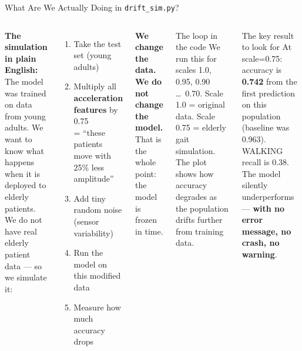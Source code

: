 \documentclass[aspectratio=169,11pt]{beamer}
\begin{document}
\begin{frame}[shrink=8]{What Are We Actually Doing in \texttt{drift\_sim.py}?}
    \begin{columns}
        \textbf{The simulation in plain English:}\\[4pt]
        The model was trained on data from young adults. We want to know what happens when it is deployed to elderly patients.\\[4pt]
        We do not have real elderly patient data --- so we simulate it:\\[4pt]
        \begin{enumerate}
            \item Take the test set (young adults)
            \item Multiply all \textbf{acceleration features} by 0.75\\= ``these patients move with 25\% less amplitude''
            \item Add tiny random noise (sensor variability)
            \item Run the model on this modified data
            \item Measure how much accuracy drops
        \end{enumerate}
        \vspace{0.1cm}
        \textbf{We change the data. We do not change the model.}\\That is the whole point: the model is frozen in time.

        \begin{exampleblock}{The loop in the code}
            We run this for scales 1.0, 0.95, 0.90 \ldots\ 0.70. Scale 1.0 = original data. Scale 0.75 = elderly gait simulation. The plot shows how accuracy degrades as the population drifts further from training data.
        \end{exampleblock}
        \vspace{0.2cm}
        \begin{alertblock}{The key result to look for}
            At scale=0.75: accuracy is \textbf{0.742} from the first prediction on this population (baseline was 0.963). WALKING recall is 0.38. The model silently underperforms --- \textbf{with no error message, no crash, no warning}.
        \end{alertblock}
    \end{columns}
\end{frame}
\end{document}
